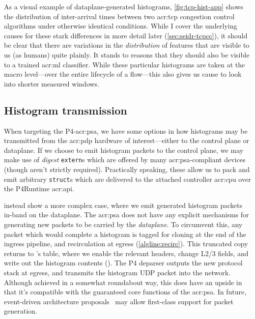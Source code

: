 As a visual example of dataplane-generated histograms, \cref{fig:tcp-hist-app} shows the distribution of inter-arrival times between two \gls{acr:tcp} congestion control algorithms under otherwise identical conditions.
While I cover the underlying causes for these stark differences in more detail later (\cref{sec:seidr-tcpcc}), it should be clear that there are variations in the \emph{distribution} of features that are visible to us (as humans) quite plainly.
It stands to reasons that they should also be visible to a trained \gls{acr:ml} classifier.
While these particular histograms are taken at the macro level---over the entire lifecycle of a flow---this also gives us cause to look into shorter measured windows.

\subsection{Histogram transmission}\label{sec:seidr-histo-tx}
When targeting the P4-\gls{acr:psa}, we have some options in how histograms may be transmitted from the \gls{acr:pdp} hardware of interest---either to the control plane or dataplane.
If we choose to emit histogram packets to the control plane, we may make use of \emph{digest} \texttt{extern}s which are offered by many \gls{acr:psa}-compliant devices (though aren't strictly required).
Practically speaking, these allow us to pack and emit arbitrary \texttt{struct}s which are delivered to the attached controller \gls{acr:cpu} over the P4Runtime \gls{acr:api}.

 instead show a more complex case, where we emit generated histogram packets in-band on the dataplane.
The \gls{acr:psa} does not have any explicit mechanisms for generating new packets to be carried by the \emph{dataplane}.
To circumvent this, any packet which would complete a histogram is tagged for cloning at the end of the ingress pipeline, and recirculation at egress (\cref{algline:recirc}).
This truncated copy returns to \seidr{}'s table, where we enable the relevant headers, change L2/3 fields, and write out the histogram contents ().
The P4 deparser outputs the new protocol stack at egress, and transmits the histogram UDP packet into the network.
Although achieved in a somewhat roundabout way, this does have an upside in that it's compatible with the guaranteed core functions of the \gls{acr:psa}.
In future, event-driven architecture proposals~\parencite{DBLP:conf/hotnets/IbanezABM19} may allow first-class support for packet generation.

